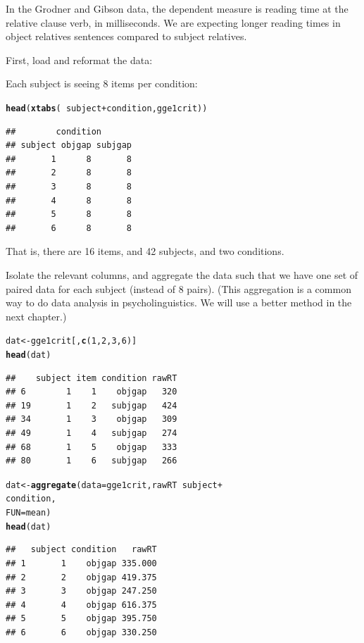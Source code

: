 \documentclass[12pt]{book}\usepackage[]{graphicx}\usepackage[]{color}
\makeatletter
\newcommand{\hlnum}[1]{\textcolor[rgb]{0.686,0.059,0.569}{#1}}%
\newcommand{\hlopt}[1]{\textcolor[rgb]{0,0,0}{#1}}%
\newcommand{\hlstd}[1]{\textcolor[rgb]{0.345,0.345,0.345}{#1}}%
\newcommand{\hlkwb}[1]{\textcolor[rgb]{0.69,0.353,0.396}{#1}}%
\newcommand{\hlkwc}[1]{\textcolor[rgb]{0.333,0.667,0.333}{#1}}%
\newcommand{\hlkwd}[1]{\textcolor[rgb]{0.737,0.353,0.396}{\textbf{#1}}}%
\newenvironment{kframe}{%
 \def\at@end@of@kframe{}%
 \ifinner\ifhmode%
  \def\at@end@of@kframe{\end{minipage}}%
  \begin{minipage}{\columnwidth}%
 \fi\fi%
 \def\FrameCommand##1{\hskip\@totalleftmargin \hskip-\fboxsep
 \colorbox{shadecolor}{##1}\hskip-\fboxsep
     \hskip-\linewidth \hskip-\@totalleftmargin \hskip\columnwidth}%
 \MakeFramed {\advance\hsize-\width
   \@totalleftmargin\z@ \linewidth\hsize
   \@setminipage}}%
 {\par\unskip\endMakeFramed%
 \at@end@of@kframe}
\newenvironment{knitrout}{}{} %
\makeatother
\begin{document}
In the Grodner and Gibson data, the dependent measure is reading time at the relative clause verb, in milliseconds. We are expecting longer reading times in object relatives sentences compared to subject relatives.

First, load and reformat the data:




Each subject is seeing 8 items per condition:

\begin{knitrout}
\color{fgcolor}\begin{kframe}
\begin{alltt}
\hlkwd{head}\hlstd{(}\hlkwd{xtabs}\hlstd{(}\hlopt{~}\hlstd{subject}\hlopt{+}\hlstd{condition,gge1crit))}
\end{alltt}
\begin{verbatim}
##        condition
## subject objgap subjgap
##       1      8       8
##       2      8       8
##       3      8       8
##       4      8       8
##       5      8       8
##       6      8       8
\end{verbatim}
\end{kframe}
\end{knitrout}

That is, there are 16 items, and 42 subjects, and two conditions.

Isolate the relevant columns, and aggregate the data such that we have one set of paired data for each subject (instead of 8 pairs). (This aggregation is a common way to do data analysis in psycholinguistics. We will use a better method in the next chapter.)

\begin{knitrout}
\color{fgcolor}\begin{kframe}
\begin{alltt}
\hlstd{dat}\hlkwb{<-}\hlstd{gge1crit[,}\hlkwd{c}\hlstd{(}\hlnum{1}\hlstd{,}\hlnum{2}\hlstd{,}\hlnum{3}\hlstd{,}\hlnum{6}\hlstd{)]}
\hlkwd{head}\hlstd{(dat)}
\end{alltt}
\begin{verbatim}
##    subject item condition rawRT
## 6        1    1    objgap   320
## 19       1    2   subjgap   424
## 34       1    3    objgap   309
## 49       1    4   subjgap   274
## 68       1    5    objgap   333
## 80       1    6   subjgap   266
\end{verbatim}
\begin{alltt}
\hlstd{dat}\hlkwb{<-}\hlkwd{aggregate}\hlstd{(}\hlkwc{data}\hlstd{=gge1crit,rawRT}\hlopt{~}\hlstd{subject}\hlopt{+}
                           \hlstd{condition,}
          \hlkwc{FUN}\hlstd{=mean)}
\hlkwd{head}\hlstd{(dat)}
\end{alltt}
\begin{verbatim}
##   subject condition   rawRT
## 1       1    objgap 335.000
## 2       2    objgap 419.375
## 3       3    objgap 247.250
## 4       4    objgap 616.375
## 5       5    objgap 395.750
## 6       6    objgap 330.250
\end{verbatim}
\end{kframe}
\end{knitrout}
\end{document}
